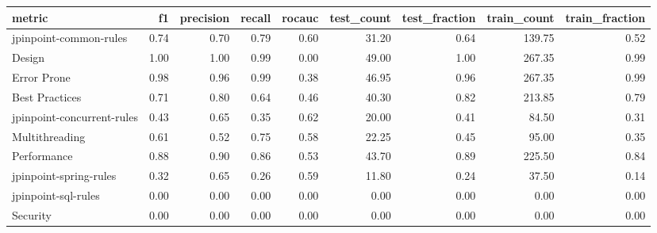 \begin{tabular}{lrrrrrrrr}
\toprule
metric &   f1 &  precision &  recall &  rocauc &  test\_count &  test\_fraction &  train\_count &  train\_fraction \\
\midrule
jpinpoint-common-rules     & 0.74 &       0.70 &    0.79 &    0.60 &       31.20 &           0.64 &       139.75 &            0.52 \\
Design                     & 1.00 &       1.00 &    0.99 &    0.00 &       49.00 &           1.00 &       267.35 &            0.99 \\
Error Prone                & 0.98 &       0.96 &    0.99 &    0.38 &       46.95 &           0.96 &       267.35 &            0.99 \\
Best Practices             & 0.71 &       0.80 &    0.64 &    0.46 &       40.30 &           0.82 &       213.85 &            0.79 \\
jpinpoint-concurrent-rules & 0.43 &       0.65 &    0.35 &    0.62 &       20.00 &           0.41 &        84.50 &            0.31 \\
Multithreading             & 0.61 &       0.52 &    0.75 &    0.58 &       22.25 &           0.45 &        95.00 &            0.35 \\
Performance                & 0.88 &       0.90 &    0.86 &    0.53 &       43.70 &           0.89 &       225.50 &            0.84 \\
jpinpoint-spring-rules     & 0.32 &       0.65 &    0.26 &    0.59 &       11.80 &           0.24 &        37.50 &            0.14 \\
jpinpoint-sql-rules        & 0.00 &       0.00 &    0.00 &    0.00 &        0.00 &           0.00 &         0.00 &            0.00 \\
Security                   & 0.00 &       0.00 &    0.00 &    0.00 &        0.00 &           0.00 &         0.00 &            0.00 \\
\bottomrule
\end{tabular}
